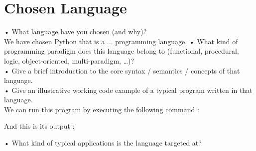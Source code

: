 \section{Chosen Language}
•	What language have you chosen (and why)?\\
We have chosen Python that is a ... programming language.
•	What kind of programming paradigm does this language belong to (functional, procedural, logic, object-oriented, multi-paradigm, …)?\\
•	Give a brief introduction to the core syntax / semantics / concepts of that language.\\
•	Give an illustrative working code example of a typical program written in that language.\\




We can run this program by executing the following command :



And this is its output :


•	What kind of typical applications is the language targeted at?\\
